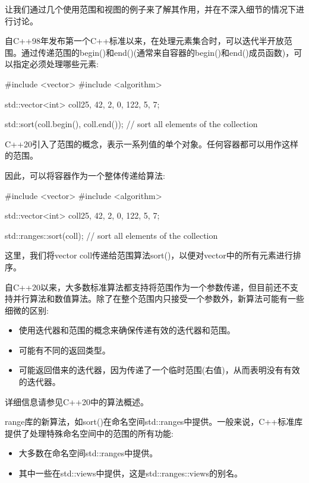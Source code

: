 

让我们通过几个使用范围和视图的例子来了解其作用，并在不深入细节的情况下进行讨论。


自C++98年发布第一个C++标准以来，在处理元素集合时，可以迭代半开放范围。通过传递范围的begin()和end()(通常来自容器的begin()和end()成员函数)，可以指定必须处理哪些元素:

\begin{cpp}
#include <vector>
#include <algorithm>

std::vector<int> coll{25, 42, 2, 0, 122, 5, 7};

std::sort(coll.begin(), coll.end()); // sort all elements of the collection
\end{cpp}

C++20引入了范围的概念，表示一系列值的单个对象。任何容器都可以用作这样的范围。

因此，可以将容器作为一个整体传递给算法:

\begin{cpp}
#include <vector>
#include <algorithm>

std::vector<int> coll{25, 42, 2, 0, 122, 5, 7};

std::ranges::sort(coll); // sort all elements of the collection
\end{cpp}

这里，我们将vector coll传递给范围算法sort()，以便对vector中的所有元素进行排序。

自C++20以来，大多数标准算法都支持将范围作为一个参数传递，但目前还不支持并行算法和数值算法。除了在整个范围内只接受一个参数外，新算法可能有一些细微的区别:

\begin{itemize}
\item
使用迭代器和范围的概念来确保传递有效的迭代器和范围。

\item
可能有不同的返回类型。

\item
可能返回借来的迭代器，因为传递了一个临时范围(右值)，从而表明没有有效的迭代器。
\end{itemize}

详细信息请参见C++20中的算法概述。


range库的新算法，如sort()在命名空间std::ranges中提供。一般来说，C++标准库提供了处理特殊命名空间中的范围的所有功能:

\begin{itemize}
\item
大多数在命名空间std::ranges中提供。

\item
其中一些在std::views中提供，这是std::ranges::views的别名。
\end{itemize}

